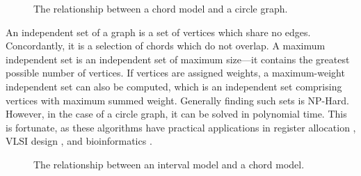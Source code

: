 \documentclass[12pt, a4paper]{article}
\begin{document}
\begin{figure}
\begin{center}
\end{center}
\caption{The relationship between a chord model and a circle graph.}
\label{circle2graph}
\end{figure}


An independent set of a graph is a set of vertices which share no edges. Concordantly, it is a selection of chords which do not overlap. A maximum independent set is an independent set of maximum size---it contains the greatest possible number of vertices. If vertices are assigned weights, a maximum-weight independent set can also be computed, which is an independent set comprising vertices with maximum summed weight. Generally finding such sets is NP-Hard. However, in the case of a circle graph, it can be solved in polynomial time. This is fortunate, as these algorithms have practical applications in register allocation \cite{de1999graph}, VLSI design \cite{cong1990over}, and bioinformatics \cite{swenson2009maximum}.

\begin{figure}
\begin{center}
\end{center}
\caption{The relationship between an interval model and a chord model.}
\label{interval2circle}
\end{figure}
\end{document}
